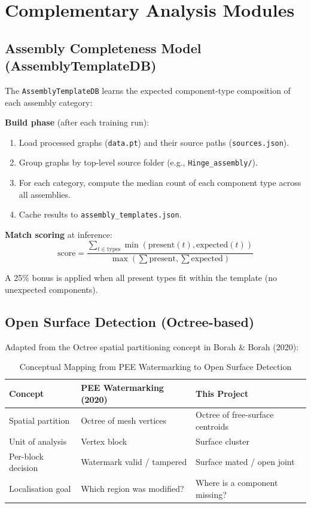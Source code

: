 \documentclass[12pt]{report}
\begin{document}
\section{Complementary Analysis Modules}

\subsection{Assembly Completeness Model (AssemblyTemplateDB)}

The \texttt{AssemblyTemplateDB} learns the expected component-type composition of each assembly category:

\textbf{Build phase} (after each training run):
\begin{enumerate}
    \item Load processed graphs (\texttt{data.pt}) and their source paths (\texttt{sources.json}).
    \item Group graphs by top-level source folder (e.g., \texttt{Hinge\_assembly/}).
    \item For each category, compute the median count of each component type across all assemblies.
    \item Cache results to \texttt{assembly\_templates.json}.
\end{enumerate}

\textbf{Match scoring} at inference:
\begin{equation}
\text{score} = \frac{\sum_{t \in \text{types}} \min(\text{present}(t), \text{expected}(t))}{\max(\sum \text{present}, \sum \text{expected})}
\end{equation}

A 25\% bonus is applied when all present types fit within the template (no unexpected components).

\subsection{Open Surface Detection (Octree-based)}

Adapted from the Octree spatial partitioning concept in Borah \& Borah (2020):

\begin{table}[H]
\centering
\caption{Conceptual Mapping from PEE Watermarking to Open Surface Detection}
\begin{tabular}{l l l}
\toprule
\textbf{Concept} & \textbf{PEE Watermarking (2020)} & \textbf{This Project} \\
\midrule
Spatial partition & Octree of mesh vertices & Octree of free-surface centroids \\
Unit of analysis & Vertex block & Surface cluster \\
Per-block decision & Watermark valid / tampered & Surface mated / open joint \\
Localisation goal & Which region was modified? & Where is a component missing? \\
\bottomrule
\end{tabular}
\end{table}
\end{document}
